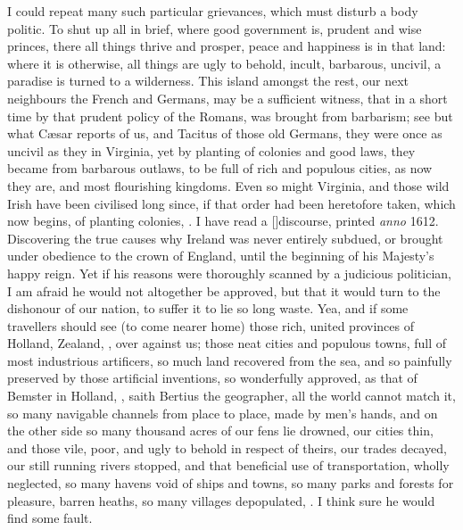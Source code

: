 I could repeat many such particular grievances, which must disturb a
body politic. To shut up all in brief, where good government is,
prudent and wise princes, there all things thrive and prosper, peace
and happiness is in that land: where it is otherwise, all things are
ugly to behold, incult, barbarous, uncivil, a paradise is turned to a
wilderness. This island amongst the rest, our next neighbours the
French and Germans, may be a sufficient witness, that in a short time
by that prudent policy of the Romans, was brought from barbarism; see
but what C\ae{}sar reports of us, and Tacitus of those old Germans, they
were once as uncivil as they in Virginia, yet by planting of colonies
and good laws, they became from barbarous outlaws, to be full of
rich and populous cities, as now they are, and most flourishing
kingdoms. Even so might Virginia, and those wild Irish have been
civilised long since, if that order had been heretofore taken, which
now begins, of planting colonies, \etc{}. I have read a [\baselineskip]discourse,
printed \emph{anno} 1612. Discovering the true causes why Ireland was never
entirely subdued, or brought under obedience to the crown of England,
until the beginning of his Majesty's happy reign. Yet if his reasons
were thoroughly scanned by a judicious politician, I am afraid he would
not altogether be approved, but that it would turn to the dishonour of
our nation, to suffer it to lie so long waste. Yea, and if some
travellers should see (to come nearer home) those rich, united
provinces of Holland, Zealand, \etc{}, over against us; those neat cities
and populous towns, full of most industrious artificers, so much
land recovered from the sea, and so painfully preserved by those
artificial inventions, so wonderfully approved, as that of Bemster in
Holland, , saith
Bertius the geographer, all the world cannot match it, so many
navigable channels from place to place, made by men's hands, \etc{} and on
the other side so many thousand acres of our fens lie drowned, our
cities thin, and those vile, poor, and ugly to behold in respect of
theirs, our trades decayed, our still running rivers stopped, and that
beneficial use of transportation, wholly neglected, so many havens void
of ships and towns, so many parks and forests for pleasure, barren
heaths, so many villages depopulated, \etc{}. I think sure he would find
some fault.

